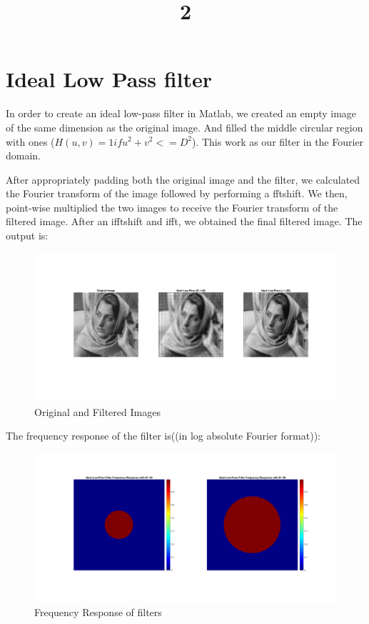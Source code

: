 \documentclass[a4paper]{article}
\title{2}
\date{}
\begin{document}
\maketitle

\section{Ideal Low Pass filter}
In order to create an ideal low-pass filter in Matlab, we created an empty image of the same dimension as the original image. And filled the middle circular region with ones ($H(u,v) = 1 if u^2 + v^2 <=D^2$). This work as our filter in the Fourier domain.

After appropriately padding both the original image and the filter, we calculated the Fourier transform of the image followed by performing a fftshift.
We then, point-wise multiplied the two images to receive the Fourier transform of the filtered image. After an ifftshift and ifft, we obtained the final filtered image. The output is:

\begin{figure}[h]
    \centering
    \includegraphics[width=1\linewidth]{img1.png}
    \caption{Original and Filtered Images}
\end{figure}

The frequency response of the filter is((in log absolute Fourier format)):
\begin{figure}[h]
    \centering
    \includegraphics[width=.5\linewidth]{img3.png}
    \caption{Frequency Response of filters}
\end{figure}
\end{document}
